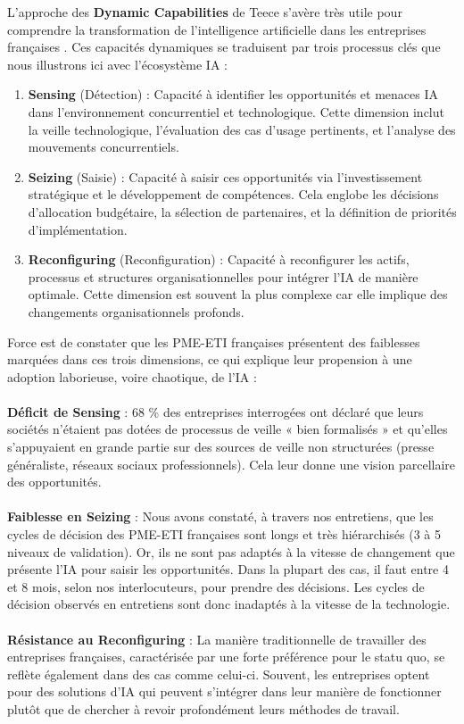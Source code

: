 L’approche des \textbf{Dynamic Capabilities} de Teece s’avère très utile pour comprendre la transformation de l’intelligence artificielle dans les entreprises françaises \cite{teece2007dynamic}. Ces capacités dynamiques se traduisent par trois processus clés que nous illustrons ici avec l’écosystème IA :

\begin{enumerate}
    \item \textbf{Sensing} (Détection) : Capacité à identifier les opportunités et menaces IA dans l'environnement concurrentiel et technologique. Cette dimension inclut la veille technologique, l'évaluation des cas d'usage pertinents, et l'analyse des mouvements concurrentiels.
    
    \item \textbf{Seizing} (Saisie) : Capacité à saisir ces opportunités via l'investissement stratégique et le développement de compétences. Cela englobe les décisions d'allocation budgétaire, la sélection de partenaires, et la définition de priorités d'implémentation.
    
    \item \textbf{Reconfiguring} (Reconfiguration) : Capacité à reconfigurer les actifs, processus et structures organisationnelles pour intégrer l'IA de manière optimale. Cette dimension est souvent la plus complexe car elle implique des changements organisationnels profonds.
\end{enumerate}
\medskip
Force est de constater que les PME-ETI françaises présentent des faiblesses marquées dans ces trois dimensions, ce qui explique leur propension à une adoption laborieuse, voire chaotique, de l'IA :
\\\\
\textbf{Déficit de Sensing} : 68 \% des entreprises interrogées ont déclaré que leurs sociétés n’étaient pas dotées de processus de veille « bien formalisés » et qu’elles s’appuyaient en grande partie sur des sources de veille non structurées (presse généraliste, réseaux sociaux professionnels). Cela leur donne une vision parcellaire des opportunités.
\\\\
\textbf{Faiblesse en Seizing} : Nous avons constaté, à travers nos entretiens, que les cycles de décision des PME-ETI françaises sont longs et très hiérarchisés (3 à 5 niveaux de validation). Or, ils ne sont pas adaptés à la vitesse de changement que présente l'IA pour saisir les opportunités. Dans la plupart des cas, il faut entre 4 et 8 mois, selon nos interlocuteurs, pour prendre des décisions. Les cycles de décision observés en entretiens sont donc inadaptés à la vitesse de la technologie.
\\\\
\textbf{Résistance au Reconfiguring} : La manière traditionnelle de travailler des entreprises françaises, caractérisée par une forte préférence pour le statu quo, se reflète également dans des cas comme celui-ci. Souvent, les entreprises optent pour des solutions d'IA qui peuvent s'intégrer dans leur manière de fonctionner plutôt que de chercher à revoir profondément leurs méthodes de travail.

